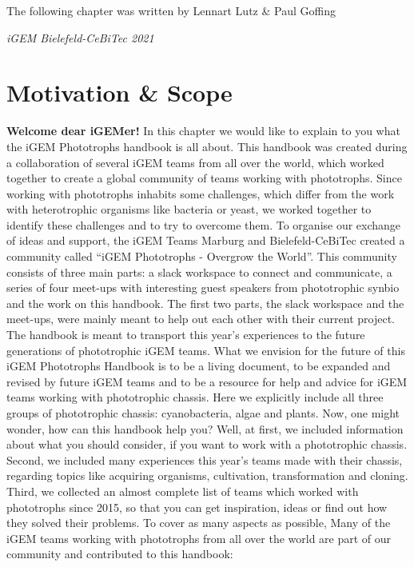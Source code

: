 \epigraph{The following chapter was written by Lennart Lutz \& 	Paul Goffing}{\textit{iGEM Bielefeld-CeBiTec 2021}}

\section{Motivation \& Scope} 
\textbf{Welcome dear iGEMer!}
\newline\newline
In this chapter we would like to explain to you what the iGEM Phototrophs handbook is all about. This handbook was created during a collaboration of several iGEM teams from all over the world, which worked together to create a global community of teams working with phototrophs. Since working with phototrophs inhabits some challenges, which differ from the work with heterotrophic organisms like bacteria or yeast, we worked together to identify these challenges and to try to overcome them. To organise our exchange of ideas and support, the iGEM Teams Marburg and Bielefeld-CeBiTec created a community called “iGEM Phototrophs - Overgrow the World”. This community consists of three main parts: a slack workspace to connect and communicate, a series of four meet-ups with interesting guest speakers from phototrophic synbio and the work on this handbook. The first two parts, the slack workspace and the meet-ups, were mainly meant to help out each other with their current project. The handbook is meant to transport this year’s experiences to the future generations of phototrophic iGEM teams.
\newline\newline
What we envision for the future of this iGEM Phototrophs Handbook is to be a living document, to be expanded and revised by future iGEM teams and to be a resource for help and advice for iGEM teams working with phototrophic chassis. Here we explicitly include all three groups of phototrophic chassis: cyanobacteria, algae and plants. Now, one might wonder, how can this handbook help you? Well, at first, we included information about what you should consider, if you want to work with a phototrophic chassis. Second, we included many experiences this year’s teams made with their chassis, regarding topics like acquiring organisms, cultivation, transformation and cloning. Third, we collected an almost complete list of teams which worked with phototrophs since 2015, so that you can get inspiration, ideas or find out how they solved their problems. To cover as many aspects as possible, 
\newline\newline
Many of the iGEM teams working with phototrophs from all over the world are part of our community and contributed to this handbook:

